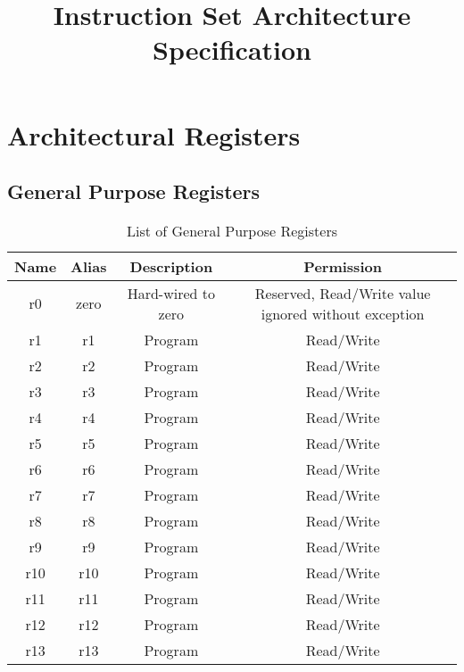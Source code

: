 \documentclass{article}
\title{Instruction Set Architecture Specification}
\date{}
\author{}
\begin{document}
\maketitle

\section{Architectural Registers}

    \subsection{General Purpose Registers}

    \begin{table}[H]
    \centering
    \caption{List of General Purpose Registers}
    \label{table:gpr}
    \begin{tabular}{|c|c|c|c|}
    \hline Name &   Alias   &   Description         &   Permission \\
    \hline r0   &   zero    &   Hard-wired to zero  &   Reserved, Read/Write value ignored without exception \\
    \hline r1   &   r1      &   Program             &   Read/Write \\
    \hline r2   &   r2      &   Program             &   Read/Write \\
    \hline r3   &   r3      &   Program             &   Read/Write \\
    \hline r4   &   r4      &   Program             &   Read/Write \\
    \hline r5   &   r5      &   Program             &   Read/Write \\
    \hline r6   &   r6      &   Program             &   Read/Write \\
    \hline r7   &   r7      &   Program             &   Read/Write \\
    \hline r8   &   r8      &   Program             &   Read/Write \\
    \hline r9   &   r9      &   Program             &   Read/Write \\
    \hline r10  &   r10     &   Program             &   Read/Write \\
    \hline r11  &   r11     &   Program             &   Read/Write \\
    \hline r12  &   r12     &   Program             &   Read/Write \\
    \hline r13  &   r13     &   Program             &   Read/Write \\

\end{tabular}
\end{table}
\end{document}

